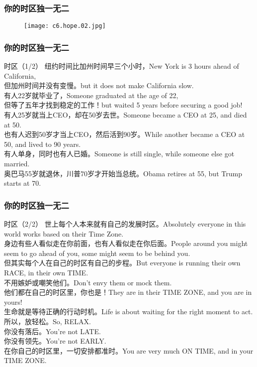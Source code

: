 \begin{frame}
  \frametitle{你的时区独一无二}
  \begin{figure}
    \centering
    \texttt{[image: c6.hope.02.jpg]}
  \end{figure}
\end{frame}

\begin{frame}
  \frametitle{你的时区独一无二}
  \begin{block}{时区（1/2）}
纽约时间比加州时间早三个小时，New York is 3 hours ahead of California,\\
但加州时间并没有变慢。but it does not make California slow.\\
有人22岁就毕业了，Someone graduated at the age of 22,\\
但等了五年才找到稳定的工作！but waited 5 years before securing a good job!\\
有人25岁就当上CEO，却在50岁去世。Someone became a CEO at 25, and died at 50.\\
也有人迟到50岁才当上CEO，然后活到90岁。While another became a CEO at 50, and lived to 90 years.\\
有人单身，同时也有人已婚。Someone is still single, while someone else got married.\\
奥巴马55岁就退休，川普70岁才开始当总统。Obama retires at 55, but Trump starts at 70.\\
  \end{block}
\end{frame}

\begin{frame}
  \frametitle{你的时区独一无二}
  \begin{block}{时区（2/2）}
    {\small
世上每个人本来就有自己的发展时区。Absolutely everyone in this world works based on their Time Zone.\\
身边有些人看似走在你前面，也有人看似走在你后面。People around you might seem to go ahead of you, some might seem to be behind you.\\
但其实每个人在自己的时区有自己的步程。But everyone is running their own RACE, in their own TIME.\\
不用嫉妒或嘲笑他们。Don't envy them or mock them.\\
他们都在自己的时区里，你也是！They are in their TIME ZONE, and you are in yours!\\
生命就是等待正确的行动时机。Life is about waiting for the right moment to act.\\
所以，放轻松。So, RELAX.\\
你没有落后。You're not LATE.\\
你没有领先。You're not EARLY.\\
在你自己的时区里，一切安排都准时。You are very much ON TIME, and in your TIME ZONE.
}
  \end{block}
\end{frame}





